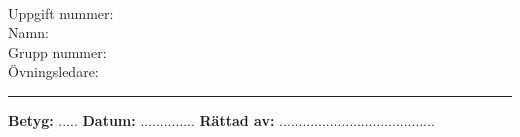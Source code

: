 \thispagestyle{empty}

\textbf{\large\coursenr\ \coursename}

\begin{description}
\item[Uppgift nummer:] \assignmentnr
\item[Namn:] \theauthor
\item[Grupp nummer:] \groupnr
\item[Övningsledare:] \courseleader
\end{description}

\rule[0.5ex]{1\columnwidth}{1pt}

\textbf{Betyg:} ..... \hfill \textbf{Datum:} .............. \hfill \textbf{Rättad
av:} ........................................
